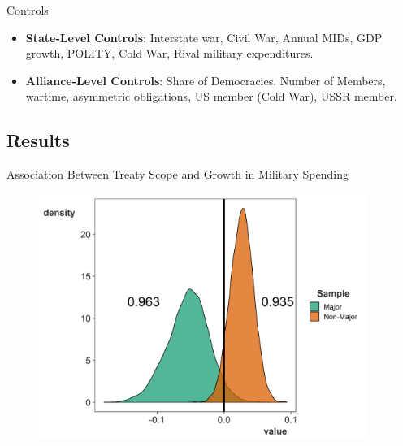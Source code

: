 \documentclass{beamer}
\begin{document}

\begin{frame}{Controls}

\begin{itemize}
\item \textbf{State-Level Controls}: Interstate war, Civil War, Annual MIDs, GDP growth, POLITY, Cold War, Rival military expenditures. 
\pause 
\item \textbf{Alliance-Level Controls}: Share of Democracies, Number of Members, wartime, asymmetric obligations, US member (Cold War), USSR member.

\end{itemize} 

\end{frame}



\subsection{Results}


\begin{frame}{Association Between Treaty Scope and Growth in Military Spending} 

\begin{figure}
	\centering
		\includegraphics[width=0.95\textwidth]{str-post.png}
	\label{fig:str-post}
\end{figure}


\end{frame}
\end{document}
